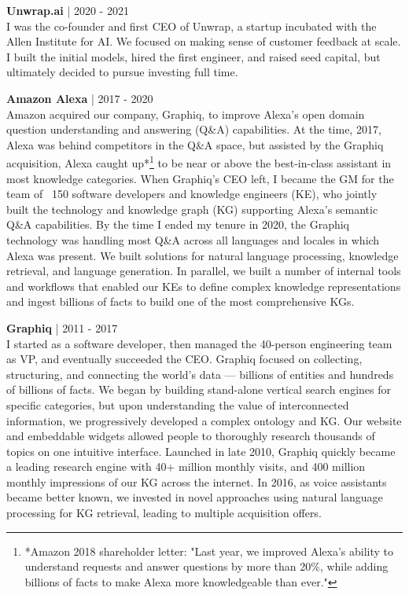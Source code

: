 \documentclass[a4paper,10pt]{article}
\begin{document}
\vspace{5pt} %

\noindent
\textbf{Unwrap.ai} | 2020 - 2021 \\
I was the co-founder and first CEO of Unwrap, a startup incubated with the Allen Institute for AI. We focused on making sense of customer feedback at scale. I built the initial models, hired the first engineer, and raised seed capital, but ultimately decided to pursue investing full time.

\vspace{5pt} %

\noindent
\textbf{Amazon Alexa} | 2017 - 2020 \\
Amazon acquired our company, Graphiq, to improve Alexa's open domain question understanding and answering (Q\&A) capabilities. At the time, 2017, Alexa was behind competitors in the Q\&A space, but assisted by the Graphiq acquisition, Alexa caught up*\footnote{*Amazon 2018 shareholder letter: "Last year, we improved Alexa’s ability to understand requests and answer questions by more than 20\%, while adding billions of facts to make Alexa more knowledgeable than ever."}  to be near or above the best-in-class assistant in most knowledge categories. When Graphiq's CEO left, I became the GM for the team of ~150 software developers and knowledge engineers (KE), who jointly built the technology and knowledge graph (KG) supporting Alexa's semantic Q\&A capabilities. By the time I ended my tenure in 2020, the Graphiq technology was handling most Q\&A across all languages and locales in which Alexa was present. We built solutions for natural language processing, knowledge retrieval, and language generation. In parallel, we built a number of internal tools and workflows that enabled our KEs to define complex knowledge representations and ingest billions of facts to build one of the most comprehensive KGs.

\vspace{5pt} %

\noindent
\textbf{Graphiq} | 2011 - 2017 \\
I started as a software developer, then managed the 40-person engineering team as VP, and eventually succeeded the CEO. Graphiq focused on collecting, structuring, and connecting the world’s data — billions of entities and hundreds of billions of facts. We began by building stand-alone vertical search engines for specific categories, but upon understanding the value of interconnected information, we progressively developed a complex ontology and KG. Our website and embeddable widgets allowed people to thoroughly research thousands of topics on one intuitive interface. Launched in late 2010, Graphiq quickly became a leading research engine with 40+ million monthly visits, and 400 million monthly impressions of our KG across the internet. In 2016, as voice assistants became better known, we invested in novel approaches using natural language processing for KG retrieval, leading to multiple acquisition offers.
\end{document}
